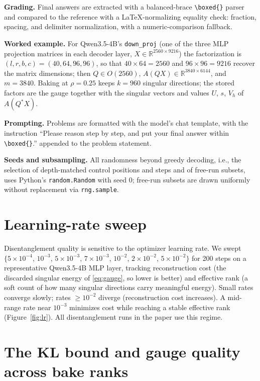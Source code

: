 \documentclass[9pt]{article}
\begin{document}
\textbf{Grading.} Final answers are extracted with a balanced-brace
\texttt{\textbackslash boxed\{\}} parser and compared to the reference with a
LaTeX-normalizing equality check: fraction, spacing, and delimiter
normalization, with a numeric-comparison fallback.

\textbf{Worked example.} For Qwen3.5-4B's \texttt{down\_proj} (one of the
three MLP projection matrices in each decoder layer,
$X \in \mathbb{R}^{2560 \times 9216}$) the factorization is
$(l,r,b,c) = (40,64,96,96)$, so that $40 \times 64 = 2560$ and
$96 \times 96 = 9216$ recover the matrix dimensions; then $Q \in O(2560)$,
$A(QX) \in \mathbb{R}^{3840 \times 6144}$, and $m = 3840$. Baking at
$\rho{=}0.25$ keeps $k{=}960$ singular directions; the stored factors are
the gauge together with the singular vectors and values $U$, $s$, $V_h$ of
$A(Q^{*}X)$.

\textbf{Prompting.} Problems are formatted with the model's chat template,
with the instruction ``Please reason step by step, and put your final answer
within \texttt{\textbackslash boxed\{\}}.'' appended to the problem
statement.

\textbf{Seeds and subsampling.} All randomness beyond greedy decoding, i.e.,
the selection of depth-matched control positions and steps and of free-run
subsets, uses Python's \texttt{random.Random} with seed 0; free-run subsets
are drawn uniformly without replacement via \texttt{rng.sample}.

\section{Learning-rate sweep}\label{app:lr}

Disentanglement quality is sensitive to the optimizer learning rate. We swept
$\{5{\times}10^{-4}$, $10^{-3}$, $5{\times}10^{-3}$, $7{\times}10^{-3}$,
$10^{-2}$, $2{\times}10^{-2}$, $5{\times}10^{-2}\}$ for 200 steps on a representative
Qwen3.5-4B MLP layer, tracking reconstruction cost (the discarded singular
energy of \eqref{eq:gauge}, so lower is better) and effective rank (a soft
count of how many singular directions carry meaningful energy). Small rates
converge slowly; rates $\geq 10^{-2}$ diverge (reconstruction cost
increases). A mid-range rate near $10^{-3}$ minimizes cost while reaching a
stable effective rank (Figure~\ref{fig:lr}). All disentanglement runs in the
paper use this regime.

\section{The KL bound and gauge quality across bake ranks}\label{app:gauge}
\end{document}
